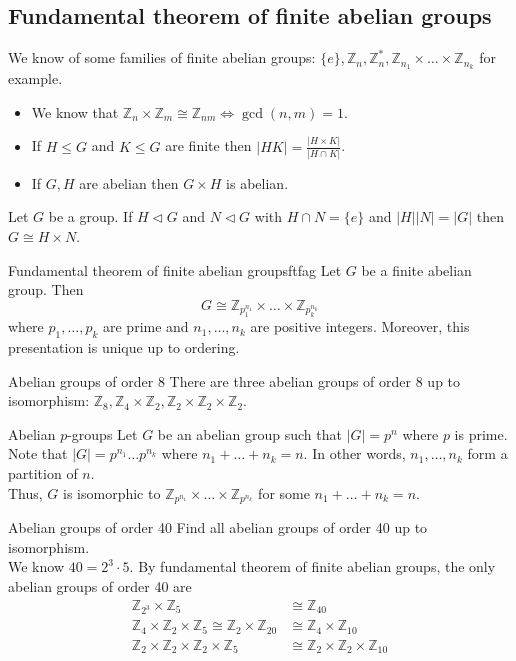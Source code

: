 \documentclass[12pt]{article}
\newcommand{\Z}{\mathbb{Z}}
\begin{document}
	\subsection{Fundamental theorem of finite abelian groups}
	
	\begin{myrem}{}{}
		We know of some families of finite abelian groups: $\{e\}, \Z_n, \Z_n^*, \Z_{n_1}\times\dots\times\Z_{n_k}$ for example.
		\begin{itemize}
			\item We know that $\Z_n\times\Z_m\cong\Z_{nm}\Longleftrightarrow\gcd(n, m)=1$.
			\item If $H\leq G$ and $K\leq G$ are finite then $|HK|=\frac{|H\times K|}{|H\cap K|}$.
			\item If $G, H$ are abelian then $G\times H$ is abelian.
		\end{itemize}
	\end{myrem}
	
	\begin{myprop}{}{}
		Let $G$ be a group. If $H\lhd G$ and $N\lhd G$ with $H\cap N=\{e\}$ and $|H||N|=|G|$ then $G\cong H\times N$.
	\end{myprop}
	
	\begin{mythm}{Fundamental theorem of finite abelian groups}{ftfag}
		Let $G$ be a finite abelian group. Then
		\[ G\cong\Z_{p_1^{n_1}}\times\dots\times\Z_{p_k^{n_k}} \]
		where $p_1, \dots, p_k$ are prime and $n_1, \dots, n_k$ are positive integers. Moreover, this presentation is unique up to ordering.
	\end{mythm}
	
	\begin{myex}{Abelian groups of order 8}{}
		There are three abelian groups of order 8 up to isomorphism: $\Z_8, \Z_4\times\Z_2, \Z_2\times\Z_2\times\Z_2$.
	\end{myex}
	
	\begin{myrem}{Abelian $p$-groups}{}
		Let $G$ be an abelian group such that $|G|=p^n$ where $p$ is prime. Note that $|G|=p^{n_1}\dots p^{n_k}$ where $n_1+\dots+n_k=n$. In other words, $n_1, \dots, n_k$ form a partition of $n$.\\
		
		Thus, $G$ is isomorphic to $\Z_{p^{n_1}}\times\dots\times\Z_{p^{n_k}}$ for some $n_1+\dots+n_k=n$.
	\end{myrem}
	
	\begin{myex}{Abelian groups of order 40}{}
		Find all abelian groups of order 40 up to isomorphism.\\
		
		We know $40=2^3\cdot5$. By fundamental theorem of finite abelian groups, the only abelian groups of order 40 are
		\begin{align*}
			\Z_{2^3}\times\Z_5&\cong\Z_{40}\\
			\Z_4\times\Z_2\times\Z_5\cong\Z_2\times\Z_{20}&\cong\Z_4\times\Z_{10}\\
			\Z_2\times\Z_2\times\Z_2\times\Z_5&\cong\Z_2\times\Z_2\times\Z_{10}
		\end{align*}
	\end{myex}
	
\end{document}
